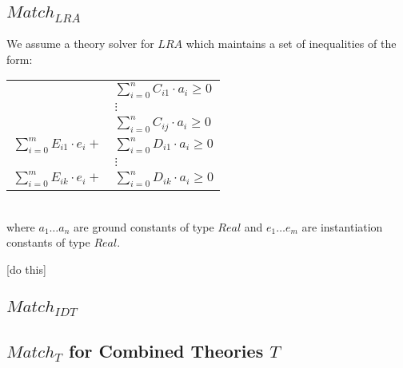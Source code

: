 \documentclass{llncs}
\begin{document}
\begin{comment}
The following example shows use of this theorem:

{\bf Example 6}
Say we wish to determine the satisfiability of the set of formulas $S = \{ a \neq b, f( a ) \neq d, (\psi :) \forall \bar{x}. (x = b \Rightarrow f( x ) = d) \}$.
After applying Unit propagation, applying Decide for $\bot^{\neg \psi}$, applying Counterexample $\forall$-Inst, after unit propagation we arrive in the DPLL(T) state $a \neq b, f( a ) \neq d, \neg( \bot^{\neg \psi} )^d, e = b, f( e ) \neq d \parallel S$.
Note that $f( e )$ is disequality combatible since $e \neq a$.
Therefore, by our theorem, $S$ is a satisifiable. \\
\end{comment}

\subsection{$Match_{LRA}$}

We assume a theory solver for $LRA$ which maintains a set of inequalities of the form:

\begin{tabular}{rl}
 & $\displaystyle\sum\limits_{i=0}^n C_{i1} \cdot a_i \geq 0$ \\
 & $\vdots$ \\
 & $\displaystyle\sum\limits_{i=0}^n C_{ij} \cdot a_i \geq 0$ \\
 $\displaystyle\sum\limits_{i=0}^m E_{i1} \cdot e_i +$ & $\displaystyle\sum\limits_{i=0}^n D_{i1} \cdot a_i \geq 0$ \\
 & $\vdots$ \\
 $\displaystyle\sum\limits_{i=0}^m E_{ik} \cdot e_i +$ & $\displaystyle\sum\limits_{i=0}^n D_{ik} \cdot a_i \geq 0$ \\
 \end{tabular} \\

where $a_1 \ldots a_n$ are ground constants of type $Real$ and $e_1 \ldots e_m$ are instantiation constants of type $Real$.

[do this]

\subsection{$Match_{IDT}$}

\subsection{$Match_{T}$ for Combined Theories $T$}
\end{document}
